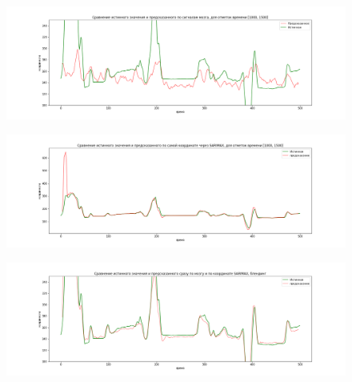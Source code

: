 \documentclass{article}
\begin{document}
\begin{figure}[H]
\includegraphics[scale=0.5]{images/1.png}
\end{figure}
\begin{figure}[H]
\includegraphics[scale=0.5]{images/2.png}
\end{figure}
\begin{figure}[H]
\includegraphics[scale=0.5]{images/3.png}
\end{figure}
\end{document}
